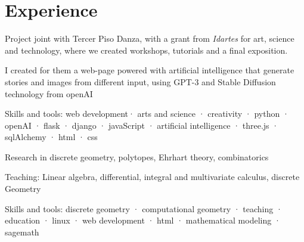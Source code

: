\documentclass[]{plushcv}
\begin{document}
\begin{minipage}[t]{0.70\textwidth} 



\section{Experience}
\vspace{\topsep} %
\begin{tightemize}
\sectionsep
\item Project joint  with Tercer Piso Danza, with a grant from \emph{Idartes} for art, science and technology, where we created workshops, tutorials and a final exposition. 
\item I created for them a web-page powered with artificial intelligence that generate stories and images from different input, using GPT-3 and Stable Diffusion technology from openAI 
\item Skills and tools: web development· arts and science · creativity · python · openAI · flask · django · javaScript  · artificial intelligence · three.js  ·  sqlAlchemy · html · css%
\end{tightemize}
\sectionsep


\sectionsep
{}
\begin{tightemize}
  \sectionsep
\item Research in discrete geometry, polytopes, Ehrhart theory, combinatorics
\item Teaching: Linear algebra, differential, integral and multivariate calculus, discrete Geometry
\item Skills and tools: discrete geometry · computational geometry · teaching · education  · linux · web development  · html · mathematical modeling · sagemath%
\end{tightemize}
\sectionsep


\end{minipage}
\end{document}
